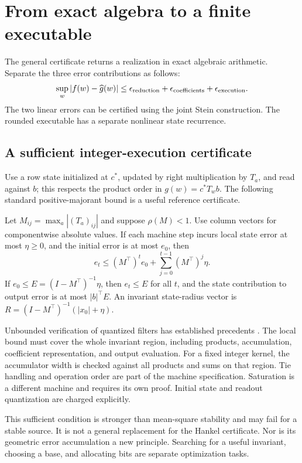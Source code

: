 \section{From exact algebra to a finite executable}\label{III:U:sec:execution}
The general certificate returns a realization in exact algebraic arithmetic.
Separate the three error contributions as follows:
\[
 \sup_w|f(w)-\widehat g(w)|
 \le\epsilon_{\rm reduction}+\epsilon_{\rm coefficients}
                                      +\epsilon_{\rm execution}.
\]
The two linear errors can be certified using the joint Stein construction.
The rounded executable has a separate nonlinear state recurrence.

\subsection{A sufficient integer-execution certificate}
Use a row state initialized at $c^*$, updated by right multiplication by
$T_a$, and read against $b$; this respects the product order in
$g(w)=c^*T_wb$. The following standard positive-majorant bound is a useful
reference certificate.
\begin{proposition}\label{III:U:prop:tube}
Let $M_{ij}=\max_a|(T_a)_{ij}|$ and suppose $\rho(M)<1$.
Use column vectors for componentwise absolute values. If each machine
step incurs local state error at most $\eta\ge0$, and the initial error
is at most $e_0$, then
\[
 e_t\le (M^\top)^te_0+\sum_{j=0}^{t-1}(M^\top)^j\eta.
\]
If $e_0\le E=(I-M^\top)^{-1}\eta$, then $e_t\le E$ for all $t$,
and the state contribution to output error is at most $|b|^\top E$.
An invariant state-radius vector is
$R=(I-M^\top)^{-1}(|x_0|+\eta)$.
\end{proposition}

Unbounded verification of quantized filters has established precedents
\citep{cox2014}. The local bound must cover the whole invariant region, including products,
accumulation, coefficient representation, and output evaluation. For a fixed
integer kernel, the accumulator width is checked against all products and
sums on that region. Tie handling and operation order are part of the
machine specification. Saturation is a different machine and requires its
own proof. Initial state and readout quantization are charged explicitly.

This sufficient condition is stronger than mean-square stability and may
fail for a stable source. It is not a general replacement for the Hankel
certificate. Nor is its geometric error accumulation a new principle.
Searching for a useful invariant, choosing a base, and allocating bits are
separate optimization tasks.

